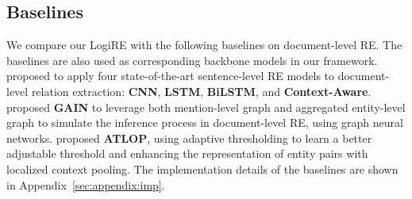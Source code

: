 \documentclass[11pt]{article}
\newcommand{\mymodel}{LogiRE\xspace}
\begin{document}
\subsection{Baselines}
We compare our \mymodel with the following baselines on document-level RE. The baselines are also used as corresponding backbone models in our framework. \citet{yao-etal-2019-docred} proposed to apply four state-of-the-art sentence-level RE models to document-level relation extraction: \textbf{CNN}, \textbf{LSTM}, \textbf{BiLSTM}, and \textbf{Context-Aware}. \cite{zeng-etal-2020-double} proposed \textbf{GAIN} to leverage both mention-level graph and aggregated entity-level graph to simulate the inference process in document-level RE, using graph neural networks.
\citet{zhou2021atlop} proposed \textbf{ATLOP}, using adaptive thresholding to learn a better adjustable threshold and enhancing the representation of entity pairs with localized context pooling. The implementation details of the baselines are shown in Appendix~\ref{sec:appendix:imp}.
\end{document}
